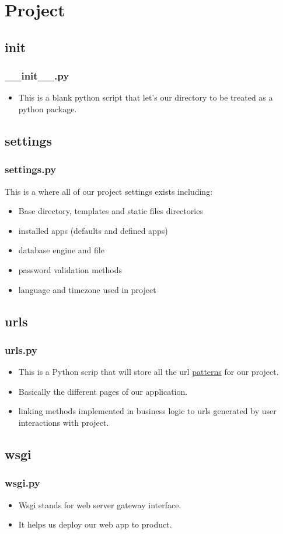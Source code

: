 \documentclass{beamer}
\begin{document}
\section{Project}
\subsection{init}
\begin{frame}
	\frametitle{\_\_init\_\_.py}
	\begin{itemize}
		\item This is a blank python script that let's our directory to be treated as a python package.
	\end{itemize}
\end{frame}

\subsection{settings}
\begin{frame}
	\frametitle{settings.py}
	This is a where all of our project settings exists including:
	\begin{itemize}
		\item Base directory, templates and static files directories
		\item installed apps (defaults and defined apps)
		\item database engine and file
		\item password validation methods
		\item language and timezone used in project
	\end{itemize}
\end{frame}

\subsection{urls}
\begin{frame}
\frametitle{urls.py}
\begin{itemize}
	\item This is a Python scrip that will store all the url \underline{patterns} for our project.
	\item Basically the different pages of our application.
	\item linking methods implemented in business logic to urls generated by user interactions with project.
\end{itemize}
\end{frame}

\subsection{wsgi}
\begin{frame}
	\frametitle{wsgi.py}
	\begin{itemize}
		\item Wsgi stands for web server gateway interface.
		\item It helps us deploy our web app to product.
	\end{itemize}
\end{frame}
\end{document}
